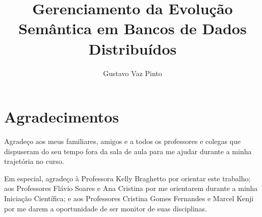 \documentclass[a4paper,12pt,twoside,english,brazilian]{book}
\title{Gerenciamento da Evolução Semântica em Bancos de Dados Distribuídos}
\author{Gustavo Vaz Pinto}
\begin{document}

\frontmatter

\pagestyle{plain}

\onehalfspacing %

\maketitle %



\chapter*{Agradecimentos}

Agradeço aos meus familiares, amigos e a todos os professores e colegas que dispuseram do seu tempo fora da sala de aula para me ajudar durante a minha trajetória no curso.

Em especial, agradeço à Professora Kelly Braghetto por orientar este trabalho; aos Professores Flávio Soares e Ana Cristina por me orientarem durante a minha Iniciação Científica; e aos Professores Cristina Gomes Fernandes e Marcel Kenji por me darem a oportunidade de ser monitor de suas disciplinas.





\cleardoublepage
\end{document}
